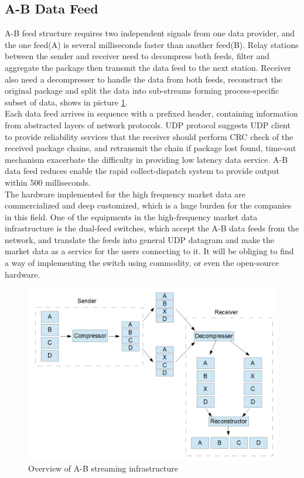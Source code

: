 \documentclass[11pt,openright,a4paper]{report}
\begin{document}
\subsection{A-B Data Feed}
A-B feed structure requires two independent signals from one data provider, and the one feed(A) is several milliseconds faster than another feed(B). Relay stations between the sender and receiver need to decompress both feeds, filter and aggregate the package then transmit the data feed to the next station. Receiver also need a decompresser to handle the data from both feeds, reconstruct the original package and split the data into sub-streams forming process-specific subset of data, shows in picture \ref{fig:3}.\\
Each data feed arrives in sequence with a prefixed header, containing information from abstracted layers of network protocols\cite{udpprotocol}. UDP protocol suggests UDP client to provide reliability services that the receiver should perform CRC check of the received package chains, and retransmit the chain if package lost found, time-out mechanism exacerbate the difficulty in providing low latency data service. A-B data feed reduces enable the rapid collect-dispatch system to provide output within 500 milliseconds\cite{zusman1999fault}.\\
The hardware implemented for the high frequency market data are commercialized and deep customized, which is a huge burden for the companies in this field. One of the equipments in the high-frequency market data infrastructure is the dual-feed switches, which accept the A-B data feeds from the network, and translate the feeds into general UDP datagram and make the market data as a service for the users connecting to it.  It will be obliging to find a way of implementing the switch using commodity, or even the open-source hardware.\\
\begin{figure}[H]
	\centering\includegraphics[width=0.7\linewidth]{picture/A-BFeed.PNG}
	\caption{Overview of A-B streaming infrastructure}
	\label{fig:3}
\end{figure}
\end{document}
